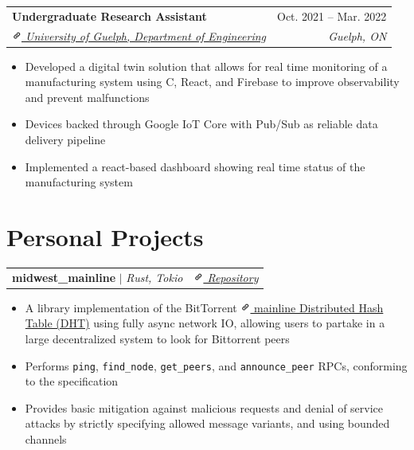 \documentclass[letterpaper, 10pt]{report}
\makeatletter
\newcommand{\resumeSubheading}[4]{
    \begin{tabular*}{\textwidth}[t]{l@{\extracolsep{\fill}}r}
        \textbf{#1}       & #2                \\
        \textit{\small#3} & \textit{\small#4} \\
    \end{tabular*}\vspace{-0.7em}
}
\newcommand{\resumeProjectHeading}[2]{
    \begin{tabular*}{\textwidth}{l@{\extracolsep{\fill}}r}
        \small#1 & #2 \\
    \end{tabular*}\vspace{-1.5em}
}
\newenvironment{ResumeItem}{
    \vspace{-0.3em}
    \begin{itemize}
        \setlength\itemsep{-0.3em}
        }{
    \end{itemize}\vspace{-0.3em}}
\newcommand{\cxx}{C\nolinebreak\hspace{-.05em}\raisebox{0.03ex}{\bf +}\nolinebreak\hspace{-.05em}\raisebox{.03ex}{\bf +}}
\newcommand{\linkIcon}{\includegraphics[height=9pt, trim=0 5cm 0 -1.5cm]{./img/link-icon}}
\makeatother
\begin{document}
\resumeSubheading
{Undergraduate Research Assistant} {Oct. 2021 -- Mar. 2022}
{\href{https://www.uoguelph.ca/engineering/}{\linkIcon{} University of Guelph, Department of Engineering}}{Guelph, ON}

\begin{ResumeItem}
    \item{Developed a digital twin solution that allows for real time monitoring of a manufacturing system using \cxx, React, and Firebase to improve observability and prevent malfunctions}
    \item{Devices backed through Google IoT Core with Pub/Sub as reliable data delivery pipeline}
    \item{Implemented a react-based dashboard showing real time status of the manufacturing system}
\end{ResumeItem}





\section{Personal Projects}
\resumeProjectHeading
{\textbf{midwest\_mainline} \(|\) \emph{Rust, Tokio}}{\href{https://github.com/Internal-Compiler-Error/midwest_mainline}{\textit{{\includegraphics[height=9pt, trim=0 5cm 0 -1.5cm]{link-icon} Repository}}}}

\begin{ResumeItem}
    \item{A library implementation of the BitTorrent \href{https://www.bittorrent.org/beps/bep_0005.html}{\linkIcon{} mainline Distributed Hash Table (DHT)} using fully async network IO, allowing users to partake in a large decentralized system to look for Bittorrent peers}
    \item{Performs \texttt{ping}, \texttt{find\_node}, \texttt{get\_peers}, and \texttt{announce\_peer} RPCs, conforming to the specification}
    \item{Provides basic mitigation against malicious requests and denial of service attacks by strictly specifying allowed message variants, and using bounded channels}
\end{ResumeItem}
\end{document}
